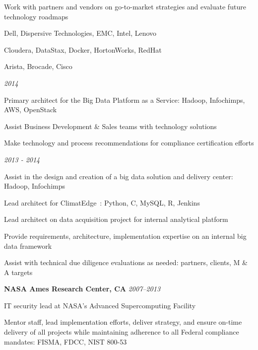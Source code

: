 \begin{itemize}
\begin{itemize*}
            \item Work with partners and vendors on go-to-market strategies and evaluate future technology roadmaps
              \begin{itemize*}
                \item Dell, Dispersive Technologies, EMC, Intel, Lenovo
                \item Cloudera, DataStax, Docker, HortonWorks, RedHat
                \item Arista, Brocade, Cisco
              \end{itemize*}
        \end{itemize*}
         {\emph{2014}}
        \begin{itemize*}
            \item Primary architect for the Big Data Platform as a Service: Hadoop, Infochimps, AWS, OpenStack
            \item Assist Business Development \& Sales teams with technology solutions
            \item Make technology and process recommendations for compliance certification efforts
        \end{itemize*}
         {\emph{2013 - 2014}}
        \begin{itemize*}
            \item Assist in the design and creation of a big data solution and delivery center: Hadoop, Infochimps
            \item Lead architect for ClimatEdge\texttrademark\ : Python, C, MySQL, R, Jenkins
            \item Lead architect on data acquisition project for internal analytical platform
            \item Provide requirements, architecture, implementation expertise on an internal big data framework
            \item Assist with technical due diligence evaluations as needed: partners, clients, M \& A targets
        \end{itemize*}
         {\textbf{NASA Ames Research Center, CA}}
        \headerrow {} {\emph{2007--2013}}
    \begin{itemize*}
        \item IT security lead at NASA's Advanced Supercomputing Facility
        \item Mentor staff, lead implementation efforts, deliver strategy, and ensure on-time delivery of all projects while maintaining adherence to all Federal compliance mandates: FISMA, FDCC, NIST 800-53

\end{itemize*}
\end{itemize}
